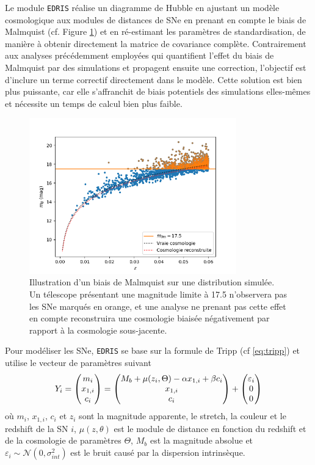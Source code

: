 \documentclass{book}
\def\edris{\texttt{EDRIS}\xspace}
\let\mcl\mathcal
\begin{document}
Le module \edris réalise un diagramme de Hubble en ajustant un modèle cosmologique aux modules de distances de SNe en prenant en compte le biais de Malmquist (cf. Figure \ref{fig:malmquist}) et en ré-estimant les paramètres de standardisation, de manière à obtenir directement la matrice de covariance complète. Contrairement aux analyses précédemment employées qui quantifient l'effet du biais de Malmquist par des simulations et propagent ensuite une correction, l'objectif est d'inclure un terme correctif directement dans le modèle. Cette solution est bien plus puissante, car elle s'affranchit de biais potentiels des simulations elles-mêmes et nécessite un temps de calcul bien plus faible.
\begin{figure}[h]
	\centering
	\includegraphics[width=0.8\textwidth]{figures/Malmquist.png}
	\caption{Illustration d'un biais de Malmquist sur une distribution simulée. Un télescope présentant une magnitude limite à 17.5 n'observera pas les SNe marqués en orange, et une analyse ne prenant pas cette effet en compte reconstruira une cosmologie biaisée négativement par rapport à la cosmologie sous-jacente.}
	\label{fig:malmquist}
\end{figure}

Pour modéliser les SNe, \edris se base sur la formule de Tripp (cf \ref{eq:tripp}) et utilise le vecteur de paramètres suivant
\begin{equation}
	Y_i = \pmqty{m_i \\ x_{1,i} \\ c_i} = \pmqty{M_b + \mu(z_i, \Theta) - \alpha x_{1,i} + \beta c_i \\ x_{1,i} \\ c_i} + \pmqty{\varepsilon_i\\0\\0}
\end{equation}
où $m_i$, $x_{1,i}$, $c_i$ et $z_i$ sont la magnitude apparente, le stretch, la couleur et le redshift de la SN $i$, $\mu(z, \theta)$ est le module de distance en fonction du redshift et de la cosmologie de paramètres $\Theta$, $M_b$ est la magnitude absolue et $\varepsilon_i \sim \mcl N(0, \sigma_{int}^2)$ est le bruit causé par la dispersion intrinsèque.
\end{document}
